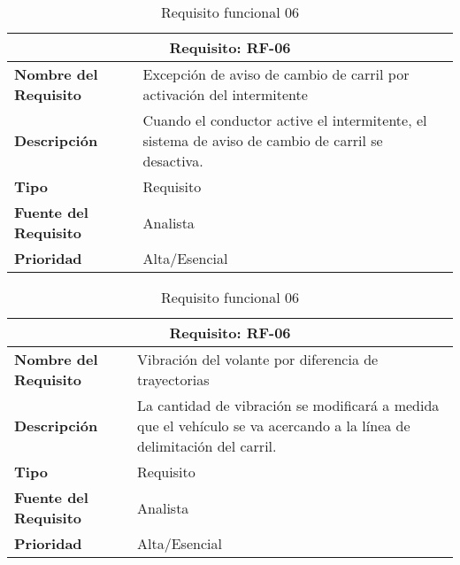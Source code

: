 \begin{table}[H]
\begin{center}
\begin{tabular}{p{} p{7cm}}
\multicolumn{2}{c}{\textbf{Requisito: RF-06} } \\
\hline \hline
\textbf{Nombre del Requisito} &  Excepción de aviso de cambio de carril por activación del intermitente\\
\hline
\textbf{Descripción} & Cuando el conductor active el intermitente, el sistema de aviso de cambio de carril se desactiva. \\
\hline
\textbf{Tipo} & Requisito  \\
\hline
\textbf{Fuente del Requisito} & Analista  \\
\hline
\textbf{Prioridad} & Alta/Esencial  \\ \hline
\end{tabular}
\caption{Requisito funcional 06}
\label{tab:RF-06}
\end{center}
\end{table}

\begin{table}[H]
\begin{center}
\begin{tabular}{p{} p{7cm}}
\multicolumn{2}{c}{\textbf{Requisito: RF-06} } \\
\hline \hline
\textbf{Nombre del Requisito} &  Vibración del volante por diferencia de trayectorias\\
\hline
\textbf{Descripción} & La cantidad de vibración se modificará a medida que el vehículo se va acercando a la línea de delimitación del carril. \\
\hline
\textbf{Tipo} & Requisito  \\
\hline
\textbf{Fuente del Requisito} & Analista  \\
\hline
\textbf{Prioridad} & Alta/Esencial  \\ \hline
\end{tabular}
\caption{Requisito funcional 06}
\label{tab:RF-06}
\end{center}
\end{table}

